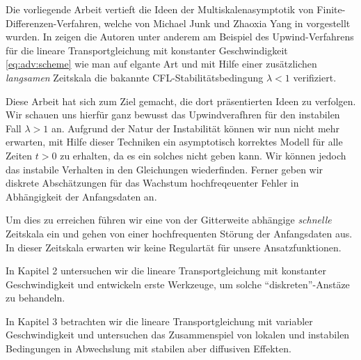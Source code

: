 
Die vorliegende Arbeit vertieft die Ideen der Multiskalenasymptotik von Finite-Dif\-fe\-ren\-zen-Verfahren, welche von Michael Junk und Zhaoxia Yang in \cite{Junk2004} vorgestellt wurden. 
In \cite{Junk2004} zeigen die Autoren unter anderem am Beispiel des Upwind-Ver\-fahrens für die lineare Transportgleichung mit konstanter Geschwindigkeit \eqref{eq:adv:scheme} wie man auf elgante Art und mit Hilfe einer zusätzlichen \emph{langsamen} Zeitskala die bakannte CFL-Sta\-bi\-li\-täts\-bedingung $\lambda < 1$ verifiziert.

Diese Arbeit hat sich zum Ziel gemacht, die dort präsentierten Ideen zu verfolgen.
Wir schauen uns hierfür ganz bewusst das Upwindverafhren für den instabilen Fall $\lambda > 1$ an.
Aufgrund der Natur der Instabilität können wir nun nicht mehr erwarten, mit Hilfe dieser Techniken ein asymptotisch korrektes Modell für alle Zeiten $t > 0$ zu erhalten, da es ein solches nicht geben kann.
Wir können jedoch das instabile Verhalten in den Gleichungen wiederfinden.
Ferner geben wir diskrete Abschätzungen für das Wachstum hochfreqeuenter Fehler in Abhängigkeit der Anfangsdaten an.

Um dies zu erreichen führen wir eine von der Gitterweite abhängige \emph{schnelle} Zeitskala ein und gehen von einer hochfrequenten Störung der Anfangsdaten aus.
In dieser Zeitskala erwarten wir keine Regulartät für unsere Ansatzfunktionen.

In Kapitel 2 untersuchen wir die lineare Transportgleichung mit konstanter Geschwindigkeit und entwickeln erste Werkzeuge, um solche ``diskreten''-Anstäze zu behandeln.

In Kapitel 3 betrachten wir die lineare Transportgleichung mit variabler Geschwindigkeit und untersuchen das Zusammenspiel von lokalen und instabilen Bedingungen in Abwechslung mit stabilen aber diffusiven Effekten.